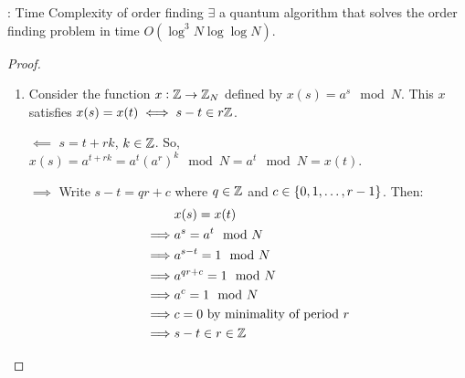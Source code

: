 \begin{propbox}{: Time Complexity of order finding}
    $\exists$ a quantum algorithm that solves the order finding problem in time $O(\log^3 N \log\log N)$. 
\end{propbox} 
\begin{proof}
    \begin{enumerate}
        \item Consider the function $x: \mathbb{Z} \to \mathbb{Z}_N$ defined by $x(s) = a^s \mod N$. This $x$ satisfies $x(s) = x(t) \iff s - t \in r\mathbb{Z}$.

        $\boxed{\impliedby}$ $s = t + rk$, $k \in \mathbb{Z}$. So, $x(s) = a^{t + rk} = a^t (a^r)^k \mod N = a^t \mod N = x(t)$.
    
        $\boxed{\implies}$ Write $s - t = qr + c$ where $q \in \mathbb{Z}$ and $c \in \set{0, 1, \ldots, r-1}$. Then:
        \begin{align*}
            &x(s) = x(t)
            \\ \implies &a^s = a^t \mod N
            \\ \implies &a^{s-t} = 1 \mod N 
            \\ \implies &a^{qr + c} = 1 \mod N 
            \\ \implies &a^c = 1 \mod N
            \\ \implies &c = 0 \text{ by minimality of period $r$}
            \\ \implies &s - t \in r \in \mathbb{Z}
        \end{align*}
    

\end{enumerate}
\end{proof}
